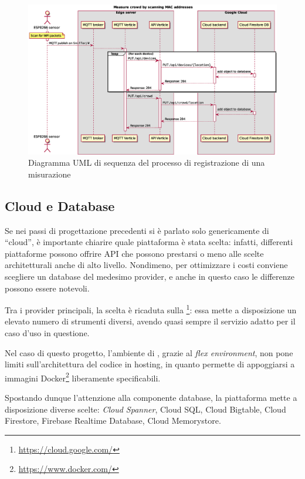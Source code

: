 \begin{figure}[H]
  \centering
  \includegraphics[width=\textwidth]{res/out/measure.eps}
  \caption{Diagramma UML di sequenza del processo di registrazione di una misurazione}%
  \label{fig:measure}
\end{figure}

\subsection{Cloud e Database}

Se nei passi di progettazione precedenti si è parlato solo genericamente di ``cloud'', è importante chiarire quale piattaforma è stata scelta:
infatti, differenti piattaforme possono offrire API che possono prestarsi o meno alle scelte architetturali anche di alto livello.
Nondimeno, per ottimizzare i costi conviene scegliere un database del medesimo provider, e anche in questo caso le differenze possono essere notevoli.

Tra i provider principali, la scelta è ricaduta sulla \footnote{\url{https://cloud.google.com/}}:
essa mette a disposizione un elevato numero di strumenti diversi, avendo quasi sempre il servizio adatto per il caso d'uso in questione.

Nel caso di questo progetto, l'ambiente di , grazie al \emph{flex environment}, non pone limiti sull'architettura del codice in hosting, in quanto permette di appoggiarsi a immagini Docker\footnote{\url{https://www.docker.com/}} liberamente specificabili.

Spostando dunque l'attenzione alla componente database, la piattaforma mette a disposizione diverse scelte:
\emph{Cloud Spanner}, {Cloud SQL}, {Cloud Bigtable}, {Cloud Firestore}, {Firebase Realtime Database}, {Cloud Memorystore}.

